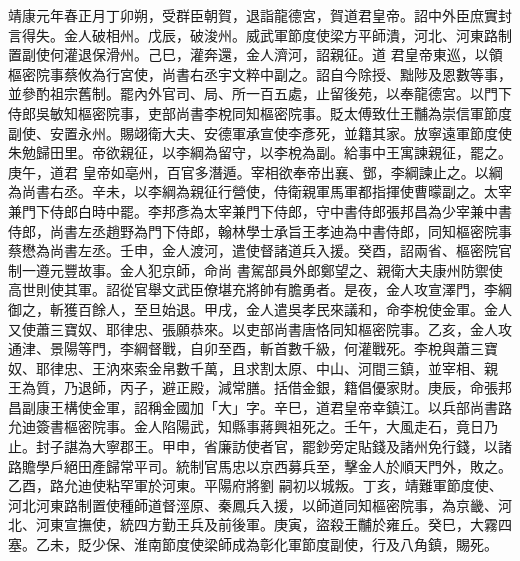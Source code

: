 \begin{pinyinscope}
 靖康元年春正月丁卯朔，受群臣朝賀，退詣龍德宮，賀道君皇帝。詔中外臣庶實封言得失。金人破相州。戊辰，破浚州。威武軍節度使梁方平師潰，河北、河東路制置副使何灌退保滑州。己巳，灌奔還，金人濟河，詔親征。道
 君皇帝東巡，以領樞密院事蔡攸為行宮使，尚書右丞宇文粹中副之。詔自今除授、黜陟及恩數等事，並參酌祖宗舊制。罷內外官司、局、所一百五處，止留後苑，以奉龍德宮。以門下侍郎吳敏知樞密院事，吏部尚書李梲同知樞密院事。貶太傅致仕王黼為崇信軍節度副使、安置永州。賜翊衛大夫、安德軍承宣使李彥死，並籍其家。放寧遠軍節度使朱勉歸田里。帝欲親征，以李綱為留守，以李梲為副。給事中王寓諫親征，罷之。庚午，道君
 皇帝如亳州，百官多潛遁。宰相欲奉帝出襄、鄧，李綱諫止之。以綱為尚書右丞。辛未，以李綱為親征行營使，侍衛親軍馬軍都指揮使曹曚副之。太宰兼門下侍郎白時中罷。李邦彥為太宰兼門下侍郎，守中書侍郎張邦昌為少宰兼中書侍郎，尚書左丞趙野為門下侍郎，翰林學士承旨王孝迪為中書侍郎，同知樞密院事蔡懋為尚書左丞。壬申，金人渡河，遣使督諸道兵入援。癸酉，詔兩省、樞密院官制一遵元豐故事。金人犯京師，命尚
 書駕部員外郎鄭望之、親衛大夫康州防禦使高世則使其軍。詔從官舉文武臣僚堪充將帥有膽勇者。是夜，金人攻宣澤門，李綱御之，斬獲百餘人，至旦始退。甲戌，金人遣吳孝民來議和，命李梲使金軍。金人又使蕭三寶奴、耶律忠、張願恭來。以吏部尚書唐恪同知樞密院事。乙亥，金人攻通津、景陽等門，李綱督戰，自卯至酉，斬首數千級，何灌戰死。李梲與蕭三寶奴、耶律忠、王汭來索金帛數千萬，且求割太原、中山、河間三鎮，並宰相、親
 王為質，乃退師，丙子，避正殿，減常膳。括借金銀，籍倡優家財。庚辰，命張邦昌副康王構使金軍，詔稱金國加「大」字。辛巳，道君皇帝幸鎮江。以兵部尚書路允迪簽書樞密院事。金人陷陽武，知縣事蔣興祖死之。壬午，大風走石，竟日乃止。封子諶為大寧郡王。甲申，省廉訪使者官，罷鈔旁定貼錢及諸州免行錢，以諸路贍學戶絕田產歸常平司。統制官馬忠以京西募兵至，擊金人於順天門外，敗之。乙酉，路允迪使粘罕軍於河東。平陽府將劉
 嗣初以城叛。丁亥，靖難軍節度使、河北河東路制置使種師道督涇原、秦鳳兵入援，以師道同知樞密院事，為京畿、河北、河東宣撫使，統四方勤王兵及前後軍。庚寅，盜殺王黼於雍丘。癸巳，大霧四塞。乙未，貶少保、淮南節度使梁師成為彰化軍節度副使，行及八角鎮，賜死。




\end{pinyinscope}
